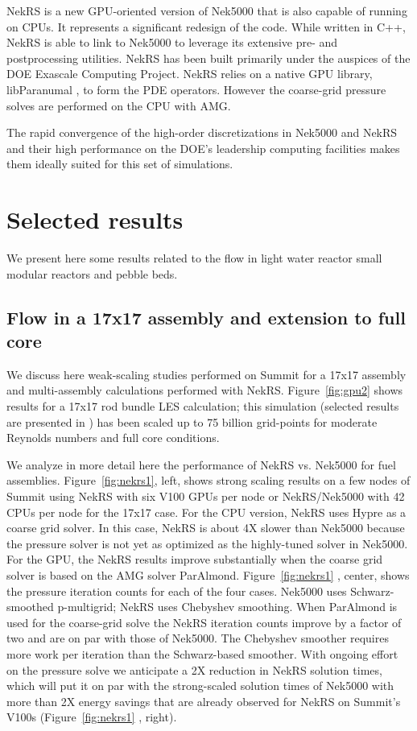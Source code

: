 \documentclass{anstrans}
\begin{document}
NekRS is  a new GPU-oriented version of Nek5000   that is also capable of running on CPUs. It represents a significant redesign
of the code.  While written in C++, NekRS is able to link to Nek5000 to
leverage its extensive pre- and postprocessing utilities.  NekRS has been
built primarily under the auspices of the DOE Exascale Computing Project.
NekRS relies on a native GPU library, libParanumal \cite{libP}, to form the PDE
operators. However the coarse-grid pressure solves are performed on the CPU with AMG.

The rapid convergence of the high-order discretizations in Nek5000 and NekRS
and their high performance on the DOE's leadership computing facilities makes
them ideally suited for this set of simulations.

\section{Selected results}

We present here some results related to the flow in light water reactor small modular reactors and  pebble beds.

\subsection{Flow in a 17x17 assembly and extension to full core}

We discuss here weak-scaling studies performed on Summit for a 17x17 assembly and multi-assembly calculations performed with NekRS. Figure~\ref{fig:gpu2} shows results for a 17x17 rod bundle LES calculation; this simulation (selected results are presented in \cite{merzari2020}) has been scaled up to 75 billion grid-points for moderate Reynolds numbers and full core conditions.

We analyze in more detail here the performance of NekRS vs. Nek5000 for fuel assemblies. Figure~\ref{fig:nekrs1}, left, shows strong scaling results on a few nodes of Summit using NekRS with six V100 GPUs per node or NekRS/Nek5000 with 42 CPUs per node for the 17x17 case. For the CPU version, NekRS uses Hypre as a coarse grid solver. In this case, NekRS is about 4X slower than Nek5000 because the pressure solver is not yet as optimized as the highly-tuned solver in Nek5000. For the GPU, the NekRS results improve substantially when the coarse grid solver is based on the AMG solver ParAlmond.  Figure~\ref{fig:nekrs1} , center, shows the pressure iteration counts for each of the four cases. Nek5000 uses Schwarz-smoothed p-multigrid; NekRS uses Chebyshev smoothing. When ParAlmond is used for the coarse-grid solve the NekRS iteration counts improve by a factor of two and are on par with those of Nek5000. The Chebyshev smoother requires more work per iteration than the Schwarz-based smoother.  With ongoing effort on the pressure solve we anticipate a 2X reduction in NekRS solution times, which will put it on par with the strong-scaled solution times of Nek5000 with more than 2X energy savings that are already observed for NekRS on Summit's V100s (Figure~\ref{fig:nekrs1} , right).
\end{document}
